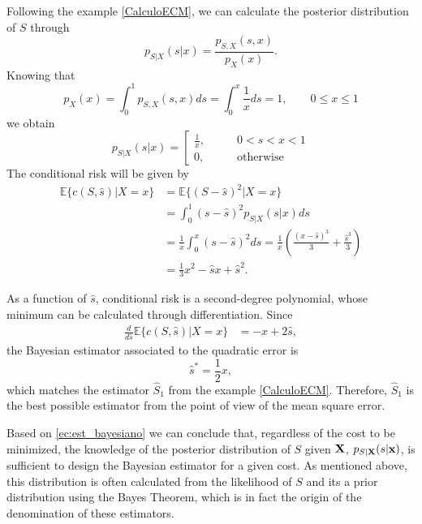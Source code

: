 \begin{example}
\label{CalculoECM2}
Following the example \ref{CalculoECM}, we can calculate the posterior distribution of $S$ through
\begin{equation}
p_{S|X}(s|x) = \frac{p_{S,X}(s,x)}{p_X(x)}. 
\end{equation}
Knowing that
\begin{equation}
p_{X}(x) = \int_0^1 p_{S,X}(s,x) ds = \int_0^x \frac{1}{x} ds = 1,   \qquad 0\le x\le 1
\end{equation}
we obtain
\begin{equation}
p_{S|X}(s|x) = \left[
\begin{array}{ll}
\frac{1}{x}, & \qquad 0<s<x<1 \\
0,           & \qquad \text{otherwise}
\end{array}
\right.
\end{equation}
The conditional risk will be given by
\begin{align}
\mathbb{E}\{c(S,\hat s)|X=x\} 
   &= \mathbb{E}\{(S-\hat s)^2|X=x\} \nonumber\\
   &= \int_0^1 (s-\hat{s})^2 p_{S|X}(s|x) ds   \nonumber\\
   &= \frac{1}{x} \int_0^x (s-\hat{s})^2 ds  
    = \frac{1}{x} \left(\frac{(x-\hat{s})^3}{3} + \frac{\hat{s}^3}{3} \right)    \nonumber\\
   &= \frac{1}{3}x^2 - \hat{s} x + \hat{s}^2. 
\label{Est:ECMsx}
\end{align}

As a function of $\hat{s}$, conditional risk is a second-degree polynomial, whose minimum can be calculated through differentiation. Since
\begin{align}
\frac{d}{d\hat{s}} \mathbb{E}\{c(S,\hat s)|X=x\} 
   &= - x + 2 \hat{s} ,
\end{align}
the Bayesian estimator associated to the quadratic error is
\begin{equation}
\label{eq:sopt_halfx}
\hat{s}^* = \frac{1}{2}x,
\end{equation}
which matches the estimator $\hat{S}_1$ from the example \ref{CalculoECM}. Therefore, $\hat{S}_1$ is the best possible estimator from the point of view of the mean square error.
\end{example}\vspace{0.4cm}

Based on \eqref{ec:est_bayesiano} we can conclude that, regardless of the cost to be minimized, the knowledge of the posterior distribution of $S$ given ${\bf X}$, $p_{S|{\bf X}}(s|{\bf x})$, is sufficient to design the Bayesian estimator for a given cost. As mentioned above, this distribution is often calculated from the likelihood of $S$ and its a prior distribution using the Bayes Theorem, which is in fact the origin of the denomination of these estimators.

